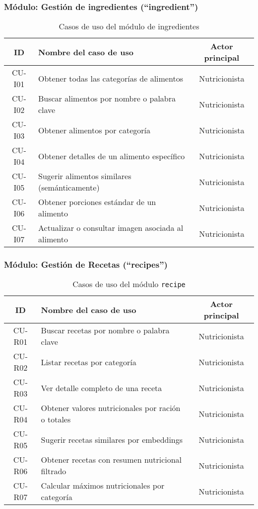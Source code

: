 \subsubsection*{Módulo: Gestión de ingredientes (``ingredient'')}

\begin{table}[H]
\centering
\begin{tabular}{|c|p{7.5cm}|c|}
\hline
\textbf{ID} & \textbf{Nombre del caso de uso} & \textbf{Actor principal} \\
\hline
CU-I01 & Obtener todas las categorías de alimentos & Nutricionista \\
\hline
CU-I02 & Buscar alimentos por nombre o palabra clave & Nutricionista \\
\hline
CU-I03 & Obtener alimentos por categoría & Nutricionista \\
\hline
CU-I04 & Obtener detalles de un alimento específico & Nutricionista \\
\hline
CU-I05 & Sugerir alimentos similares (semánticamente) & Nutricionista \\
\hline
CU-I06 & Obtener porciones estándar de un alimento & Nutricionista \\
\hline
CU-I07 & Actualizar o consultar imagen asociada al alimento & Nutricionista \\
\hline
\end{tabular}
\caption{Casos de uso del módulo de ingredientes}
\end{table}

\subsubsection*{Módulo: Gestión de Recetas (``recipes'')}

\begin{table}[H]
\centering
\begin{tabular}{|c|p{7.5cm}|c|}
\hline
\textbf{ID} & \textbf{Nombre del caso de uso} & \textbf{Actor principal} \\
\hline
CU-R01 & Buscar recetas por nombre o palabra clave & Nutricionista \\
\hline
CU-R02 & Listar recetas por categoría & Nutricionista \\
\hline
CU-R03 & Ver detalle completo de una receta & Nutricionista \\
\hline
CU-R04 & Obtener valores nutricionales por ración o totales & Nutricionista \\
\hline
CU-R05 & Sugerir recetas similares por embeddings & Nutricionista \\
\hline
CU-R06 & Obtener recetas con resumen nutricional filtrado & Nutricionista \\
\hline
CU-R07 & Calcular máximos nutricionales por categoría & Nutricionista \\
\hline
\end{tabular}
\caption{Casos de uso del módulo \texttt{recipe}}
\end{table}

